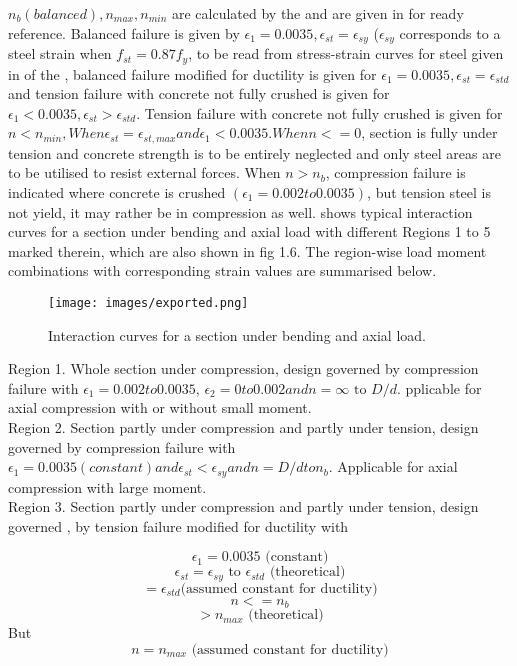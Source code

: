 $n_b (balanced), n_{max}, n_{min}$ are calculated by the  and are
given in  for ready reference. Balanced failure is given by
$\epsilon_1 = 0.0035, \epsilon_{st} =\epsilon_{sy}$ ($\epsilon_{sy}$
corresponds to a steel strain when $f_{st} = 0.87 f_y$, to be read from
stress-strain curves for steel given in  of the
, balanced failure modified for ductility is given for
$\epsilon_1 = 0.0035, \epsilon_{st} = \epsilon_{std}$ and tension failure
with concrete not fully crushed is given for
$\epsilon_1 < 0.0035, \epsilon_{st} > \epsilon_{std}$. Tension failure 
with concrete not fully crushed is given for
$n < n_{min}, When \epsilon_{st} = \epsilon_{st,max} and \epsilon_1 < 0.0035. When n<= 0$,
section is fully under tension and concrete strength is to be entirely neglected and only
steel areas are to be utilised to resist external forces. When $n>n_b$, compression failure 
is indicated where concrete is crushed $(\epsilon_1= 0.002 to 0.0035)$, but tension steel is not
yield, it may rather be in compression as well.  shows typical
interaction curves for a section under bending and axial load with
different Regions 1 to 5 marked therein, which are also shown in fig 1.6.
The region-wise load moment combinations with corresponding strain values
are summarised below.

\begin{figure}
\centering
\texttt{[image: images/exported.png]}
\caption{Interaction curves for a section under bending and axial load.}
\label{fig:exported}
\end{figure}

Region 1. Whole section under compression, design governed by compression
failure with $\epsilon_1=0.002 to 0.0035$, $\epsilon_2=0 to 0.002 and
n=\infty \text{ to } D/d.$
pplicable for axial compression with or without small moment.\\

Region 2. Section partly under compression and partly under tension,
design governed by compression failure with
$\epsilon_1 = 0.0035 (constant) and \epsilon_{st} < \epsilon_{sy} and n = D/d to n_b.$
Applicable for axial compression with large moment.\\

Region 3. Section partly under compression and partly under tension,
design governed , by tension failure modiﬁed for ductility with

$$\epsilon_1 = 0.0035 \text{ (constant)}$$
$$\epsilon_{st} =\epsilon_{sy} \text{ to } \epsilon_{std}
\text{ (theoretical)}$$
$$=\epsilon_{std} \text{(assumed constant for ductility)}$$
$$n<= n_b$$
$$>n_{max} \text{ (theoretical)}$$
But $$n=n_{max} \text{ (assumed constant for ductility)}$$


